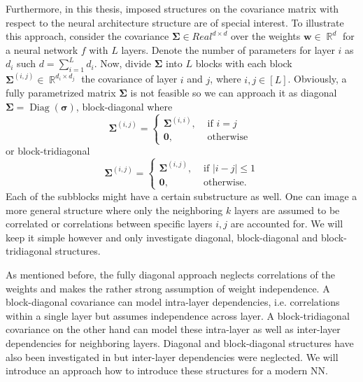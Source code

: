 \documentclass[a4paper, 11pt, oneside]{scrartcl}
\theoremstyle{break}
\DeclareMathOperator{\Real}{\mathbb{R}}
\DeclareMathOperator{\Diag}{Diag}
\newcommand{\matr}[1]{\boldsymbol{#1}}
\numberwithin{equation}{section}
\begin{document}
			Furthermore, in this thesis, imposed structures on the covariance matrix with respect to the neural architecture structure are of special interest.
			To illustrate this approach, consider the covariance $\matr{\Sigma} \in Real^{d \times d}$ over the weights $\matr{w} \in \Real^d$ for a neural network $f$ with $L$ layers.
			Denote the number of parameters for layer $i$ as $d_i$ such $d = \sum_{i=1}^L d_i$.
			Now, divide $\matr{\Sigma}$ into $L$ blocks with each block $\matr{\Sigma}^{(i, j)} \in \Real^{d_i \times d_j}$ the covariance of layer $i$ and $j$, where $i, j \in [L]$.
			Obviously, a fully parametrized matrix $\matr{\Sigma}$ is not feasible so we can approach it as diagonal $\matr{\Sigma} = \Diag(\matr{\sigma})$, block-diagonal where 
			\begin{equation*}
				\matr{\Sigma}^{(i, j)} = 
					\begin{cases}	
						\matr{\Sigma}^{(i, i)},& \text{ if } i = j \\
						\matr{0},& \text{ otherwise }
					\end{cases}
			\end{equation*}
			or block-tridiagonal
			\begin{equation*}
				\matr{\Sigma}^{(i, j)} = 
					\begin{cases}	
						\matr{\Sigma}^{(i, j)},& \text{ if } |i - j| \le 1 \\
						\matr{0},& \text{ otherwise.}
					\end{cases}
			\end{equation*}
			Each of the subblocks might have a certain substructure as well. 
			One can image a more general structure where only the neighboring $k$ layers are assumed to be correlated or correlations between specific layers $i, j$ are accounted for. 
			We will keep it simple however and only investigate diagonal, block-diagonal and block-tridiagonal structures. 

			As mentioned before, the fully diagonal approach neglects correlations of the weights and makes the rather strong assumption of weight independence.
			A block-diagonal covariance can model intra-layer dependencies, i.e. correlations within a single layer but assumes independence across layer. 
			A block-tridiagonal covariance on the other hand can model these intra-layer as well as inter-layer dependencies for neighboring layers. 
			Diagonal and block-diagonal structures have also been investigated in \parencite{ZSD+17, MG15} but inter-layer dependencies were neglected.
			We will introduce an approach how to introduce these structures for a modern NN.
\end{document}
